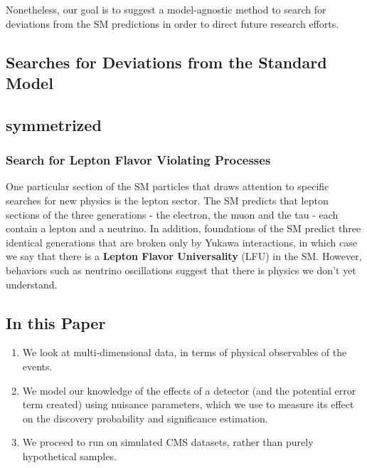 \documentclass[../Elad_Kliger_Thesis.tex]{subfiles}
\begin{document}

Nonetheless, our goal is to suggest a model-agnostic method to search for deviations from the SM predictions in order to direct future research efforts.

\subsection{Searches for Deviations from the Standard Model}

\subsection{symmetrized}

\subsubsection{Search for Lepton Flavor Violating Processes}

One particular section of the SM particles that draws attention to specific searches for new physics is the lepton sector. The SM predicts that lepton sections of the three generations - the electron, the muon and the tau -  each contain a lepton and a neutrino. In addition, foundations of the SM predict three identical generations that are broken only by Yukawa interactions, in which case we say that there is a \textbf{Lepton Flavor Universality} (LFU) in the SM. However, behaviors such as neutrino oscillations suggest that there is physics we don't yet understand.

\subsection{In this Paper}



\begin{enumerate}
    \item We look at multi-dimensional data, in terms of physical observables of the events.
    \item We model our knowledge of the effects of a detector (and the potential error term created) using nuisance parameters, which we use to measure its effect on the discovery probability and significance estimation.
    \item We proceed to run on simulated CMS datasets, rather than purely hypothetical samples.
\end{enumerate}
\end{document}
